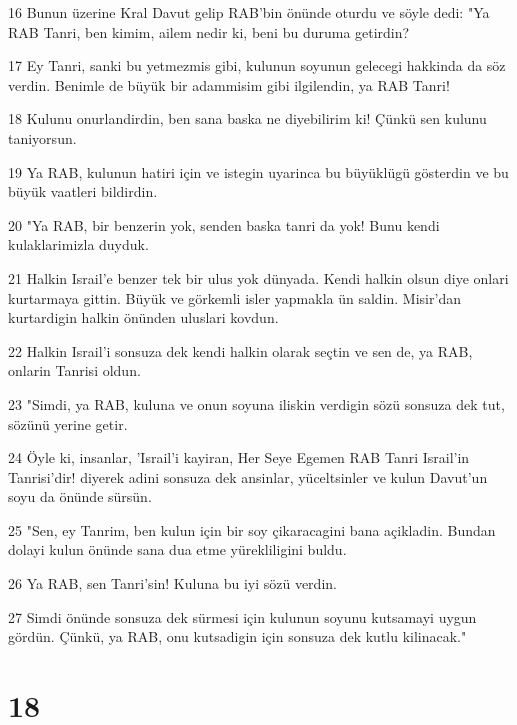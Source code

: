\par 16 Bunun üzerine Kral Davut gelip RAB'bin önünde oturdu ve söyle dedi: "Ya RAB Tanri, ben kimim, ailem nedir ki, beni bu duruma getirdin?
\par 17 Ey Tanri, sanki bu yetmezmis gibi, kulunun soyunun gelecegi hakkinda da söz verdin. Benimle de büyük bir adammisim gibi ilgilendin, ya RAB Tanri!
\par 18 Kulunu onurlandirdin, ben sana baska ne diyebilirim ki! Çünkü sen kulunu taniyorsun.
\par 19 Ya RAB, kulunun hatiri için ve istegin uyarinca bu büyüklügü gösterdin ve bu büyük vaatleri bildirdin.
\par 20 "Ya RAB, bir benzerin yok, senden baska tanri da yok! Bunu kendi kulaklarimizla duyduk.
\par 21 Halkin Israil'e benzer tek bir ulus yok dünyada. Kendi halkin olsun diye onlari kurtarmaya gittin. Büyük ve görkemli isler yapmakla ün saldin. Misir'dan kurtardigin halkin önünden uluslari kovdun.
\par 22 Halkin Israil'i sonsuza dek kendi halkin olarak seçtin ve sen de, ya RAB, onlarin Tanrisi oldun.
\par 23 "Simdi, ya RAB, kuluna ve onun soyuna iliskin verdigin sözü sonsuza dek tut, sözünü yerine getir.
\par 24 Öyle ki, insanlar, 'Israil'i kayiran, Her Seye Egemen RAB Tanri Israil'in Tanrisi'dir! diyerek adini sonsuza dek ansinlar, yüceltsinler ve kulun Davut'un soyu da önünde sürsün.
\par 25 "Sen, ey Tanrim, ben kulun için bir soy çikaracagini bana açikladin. Bundan dolayi kulun önünde sana dua etme yürekliligini buldu.
\par 26 Ya RAB, sen Tanri'sin! Kuluna bu iyi sözü verdin.
\par 27 Simdi önünde sonsuza dek sürmesi için kulunun soyunu kutsamayi uygun gördün. Çünkü, ya RAB, onu kutsadigin için sonsuza dek kutlu kilinacak."

\chapter{18}

